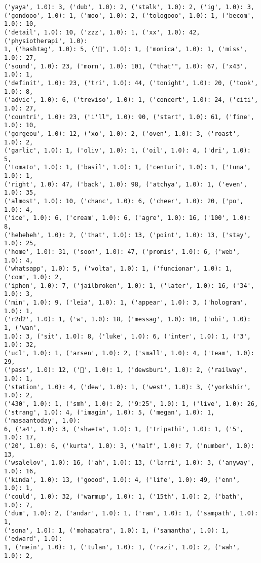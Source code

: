 \documentclass[11pt]{article}
\begin{document}
\begin{Verbatim}[commandchars=\\\{\}]
('yaya', 1.0): 3, ('dub', 1.0): 2, ('stalk', 1.0): 2, ('ig', 1.0): 3,
('gondooo', 1.0): 1, ('moo', 1.0): 2, ('tologooo', 1.0): 1, ('becom', 1.0): 10,
('detail', 1.0): 10, ('zzz', 1.0): 1, ('xx', 1.0): 42, ('physiotherapi', 1.0):
1, ('hashtag', 1.0): 5, ('💪', 1.0): 1, ('monica', 1.0): 1, ('miss', 1.0): 27,
('sound', 1.0): 23, ('morn', 1.0): 101, ("that'", 1.0): 67, ('x43', 1.0): 1,
('definit', 1.0): 23, ('tri', 1.0): 44, ('tonight', 1.0): 20, ('took', 1.0): 8,
('advic', 1.0): 6, ('treviso', 1.0): 1, ('concert', 1.0): 24, ('citi', 1.0): 27,
('countri', 1.0): 23, ("i'll", 1.0): 90, ('start', 1.0): 61, ('fine', 1.0): 10,
('gorgeou', 1.0): 12, ('xo', 1.0): 2, ('oven', 1.0): 3, ('roast', 1.0): 2,
('garlic', 1.0): 1, ('oliv', 1.0): 1, ('oil', 1.0): 4, ('dri', 1.0): 5,
('tomato', 1.0): 1, ('basil', 1.0): 1, ('centuri', 1.0): 1, ('tuna', 1.0): 1,
('right', 1.0): 47, ('back', 1.0): 98, ('atchya', 1.0): 1, ('even', 1.0): 35,
('almost', 1.0): 10, ('chanc', 1.0): 6, ('cheer', 1.0): 20, ('po', 1.0): 4,
('ice', 1.0): 6, ('cream', 1.0): 6, ('agre', 1.0): 16, ('100', 1.0): 8,
('heheheh', 1.0): 2, ('that', 1.0): 13, ('point', 1.0): 13, ('stay', 1.0): 25,
('home', 1.0): 31, ('soon', 1.0): 47, ('promis', 1.0): 6, ('web', 1.0): 4,
('whatsapp', 1.0): 5, ('volta', 1.0): 1, ('funcionar', 1.0): 1, ('com', 1.0): 2,
('iphon', 1.0): 7, ('jailbroken', 1.0): 1, ('later', 1.0): 16, ('34', 1.0): 3,
('min', 1.0): 9, ('leia', 1.0): 1, ('appear', 1.0): 3, ('hologram', 1.0): 1,
('r2d2', 1.0): 1, ('w', 1.0): 18, ('messag', 1.0): 10, ('obi', 1.0): 1, ('wan',
1.0): 3, ('sit', 1.0): 8, ('luke', 1.0): 6, ('inter', 1.0): 1, ('3', 1.0): 32,
('ucl', 1.0): 1, ('arsen', 1.0): 2, ('small', 1.0): 4, ('team', 1.0): 29,
('pass', 1.0): 12, ('🚂', 1.0): 1, ('dewsburi', 1.0): 2, ('railway', 1.0): 1,
('station', 1.0): 4, ('dew', 1.0): 1, ('west', 1.0): 3, ('yorkshir', 1.0): 2,
('430', 1.0): 1, ('smh', 1.0): 2, ('9:25', 1.0): 1, ('live', 1.0): 26,
('strang', 1.0): 4, ('imagin', 1.0): 5, ('megan', 1.0): 1, ('masaantoday', 1.0):
6, ('a4', 1.0): 3, ('shweta', 1.0): 1, ('tripathi', 1.0): 1, ('5', 1.0): 17,
('20', 1.0): 6, ('kurta', 1.0): 3, ('half', 1.0): 7, ('number', 1.0): 13,
('wsalelov', 1.0): 16, ('ah', 1.0): 13, ('larri', 1.0): 3, ('anyway', 1.0): 16,
('kinda', 1.0): 13, ('goood', 1.0): 4, ('life', 1.0): 49, ('enn', 1.0): 1,
('could', 1.0): 32, ('warmup', 1.0): 1, ('15th', 1.0): 2, ('bath', 1.0): 7,
('dum', 1.0): 2, ('andar', 1.0): 1, ('ram', 1.0): 1, ('sampath', 1.0): 1,
('sona', 1.0): 1, ('mohapatra', 1.0): 1, ('samantha', 1.0): 1, ('edward', 1.0):
1, ('mein', 1.0): 1, ('tulan', 1.0): 1, ('razi', 1.0): 2, ('wah', 1.0): 2,

\end{Verbatim}
\end{document}

